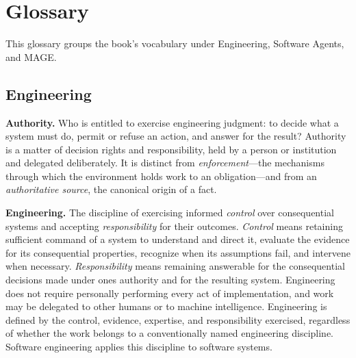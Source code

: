 



\chapter{Glossary}

This glossary groups the book’s vocabulary under Engineering, Software Agents, and MAGE.

\section{Engineering}\label{heading:engineering}

\textbf{Authority.} Who is entitled to exercise engineering judgment: to decide what a system must do, permit or refuse an action, and answer for the result? Authority is a matter of decision rights and responsibility, held by a person or institution and delegated deliberately. It is distinct from \emph{enforcement}---the mechanisms through which the environment holds work to an obligation---and from an \emph{authoritative source}, the canonical origin of a fact.

\textbf{Engineering.} The discipline of exercising informed \emph{control} over consequential systems and accepting \emph{responsibility} for their outcomes. \emph{Control} means retaining sufficient command of a system to understand and direct it, evaluate the evidence for its consequential properties, recognize when its assumptions fail, and intervene when necessary. \emph{Responsibility} means remaining answerable for the consequential decisions made under one\textquotesingle s authority and for the resulting system. Engineering does not require personally performing every act of implementation, and work may be delegated to other humans or to machine intelligence. Engineering is defined by the control, evidence, expertise, and responsibility exercised, regardless of whether the work belongs to a conventionally named engineering discipline. Software engineering applies this discipline to software systems.

